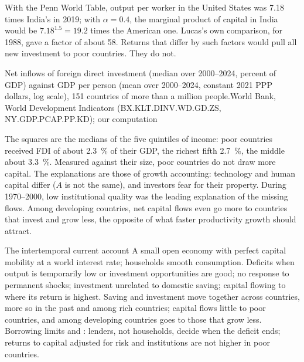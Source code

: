 With the Penn World Table, output per worker in the United States was 7.18 times
India's in 2019; with $\alpha = 0.4$, the marginal product of capital in India would be
$7.18^{1.5} = 19.2$ times the American one. Lucas's own comparison, for 1988, gave a
factor of about 58. %
Returns that differ by such factors would pull all new investment to poor
countries. They do not.

\begin{omchart}{Net inflows of foreign direct investment (median over 2000--2024,
percent of GDP) against GDP per person (mean over 2000--2024, constant 2021 PPP dollars,
log scale), 151 countries of more than a million people.}{World Bank, World
Development Indicators (BX.KLT.DINV.WD.GD.ZS, NY.GDP.PCAP.PP.KD); our computation}
\end{omchart}

The squares are the medians of the five quintiles of income: poor countries
received FDI of about 2.3~\% of their GDP, the richest fifth 2.7~\%, the middle about
3.3~\%. Measured against their size, poor countries do not draw more capital. The
explanations are those of growth accounting: technology and human capital differ
($A$ is not the same), and investors fear for their property. During 1970--2000, low
institutional quality was the leading explanation of the missing flows.
Among developing countries, net capital flows even go more to countries that
invest and grow less, the opposite of what faster productivity growth should
attract. %

\begin{model}{The intertemporal current account}
\assumes A small open economy with perfect capital mobility at a world interest
rate; households smooth consumption.
\predicts Deficits when output is temporarily low or investment opportunities are
good; no response to permanent shocks; investment unrelated to domestic saving;
capital flowing to where its return is highest.
\tested Saving and investment move together across countries, more so in the past
and among rich countries; capital flows little to poor countries, and among
developing countries goes to those that grow less. %
\breaks Borrowing limits and : lenders, not households, decide when the
deficit ends; returns to capital adjusted for risk and institutions are not
higher in poor countries.
\end{model}

